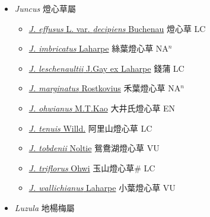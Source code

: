 
  \begin{itemize}
 \item[] \textit{Juncus} 燈心草屬
                    
  \begin{itemize}
        \item[] \href{http://www.theplantlist.org/tpl1.1/search?q=Juncus+effusus+var.+decipiens}{\textit{J. effusus} L. var. \textit{decipiens} Buchenau}   燈心草 LC
        \item[] \href{http://www.theplantlist.org/tpl1.1/search?q=Juncus+imbricatus}{\textit{J. imbricatus} Laharpe}   絲葉燈心草 NA$^n$
        \item[] \href{http://www.theplantlist.org/tpl1.1/search?q=Juncus+leschenaultii}{\textit{J. leschenaultii} J.Gay ex Laharpe}   錢蒲 LC
        \item[] \href{http://www.theplantlist.org/tpl1.1/search?q=Juncus+marginatus}{\textit{J. marginatus} Rostkovius}   禾葉燈心草 NA$^n$
        \item[] \href{http://www.theplantlist.org/tpl1.1/search?q=Juncus+ohwianus}{\textit{J. ohwianus} M.T.Kao}   大井氏燈心草 EN
        \item[] \href{http://www.theplantlist.org/tpl1.1/search?q=Juncus+tenuis}{\textit{J. tenuis} Willd.}   阿里山燈心草 LC
        \item[] \href{http://www.theplantlist.org/tpl1.1/search?q=Juncus+tobdenii}{\textit{J. tobdenii} Noltie}   鴛鴦湖燈心草 VU
        \item[] \href{http://www.theplantlist.org/tpl1.1/search?q=Juncus+triflorus}{\textit{J. triflorus} Ohwi}   玉山燈心草\# LC
        \item[] \href{http://www.theplantlist.org/tpl1.1/search?q=Juncus+wallichianus}{\textit{J. wallichianus} Laharpe}   小葉燈心草 VU
  \end{itemize}
 \item[] \textit{Luzula} 地楊梅屬
                    

\end{itemize}
